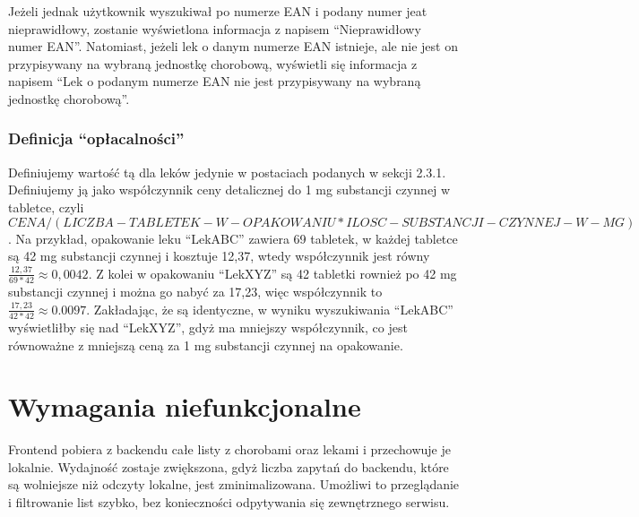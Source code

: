 \documentclass{article}
\begin{document}
      Jeżeli jednak użytkownik wyszukiwał po numerze EAN i podany numer jeat nieprawidłowy, zostanie wyświetlona informacja z napisem ``Nieprawidłowy numer EAN''.
      Natomiast, jeżeli lek o danym numerze EAN istnieje, ale nie jest on przypisywany na wybraną jednostkę chorobową,
      wyświetli się informacja z napisem ``Lek o podanym numerze EAN nie jest przypisywany na wybraną jednostkę chorobową''.

      \subsubsection{Definicja ``opłacalności''}
      Definiujemy wartość tą dla leków jedynie w postaciach podanych w sekcji 2.3.1.
      Definiujemy ją jako współczynnik ceny detalicznej do 1 mg substancji czynnej w tabletce,
      czyli $CENA / (LICZBA-TABLETEK-W-OPAKOWANIU * ILOSC-SUBSTANCJI-CZYNNEJ-W-MG)$.
      Na przykład, opakowanie leku ``LekABC'' zawiera 69 tabletek, w każdej tabletce są 42 mg substancji czynnej i kosztuje 12,37,
      wtedy współczynnik jest równy $\frac{12,37}{69 * 42} \approx 0,0042$.
      Z kolei w opakowaniu ``LekXYZ'' są 42 tabletki rownież po 42 mg substancji czynnej i można go nabyć za 17,23,
      więc współczynnik to $\frac{17,23}{42 * 42} \approx 0.0097$.
      Zakładając, że są identyczne, w wyniku wyszukiwania ``LekABC'' wyświetliłby się nad ``LekXYZ'', gdyż ma mniejszy współczynnik,
      co jest równoważne z mniejszą ceną za 1 mg substancji czynnej na opakowanie.

  \section{Wymagania niefunkcjonalne}
  Frontend pobiera z backendu całe listy z chorobami oraz lekami i przechowuje je lokalnie.
  Wydajność zostaje zwiększona, gdyż liczba zapytań do backendu, które są wolniejsze niż odczyty lokalne, jest zminimalizowana.
  Umożliwi to przeglądanie i filtrowanie list szybko, bez konieczności odpytywania się zewnętrznego serwisu.
\end{document}

